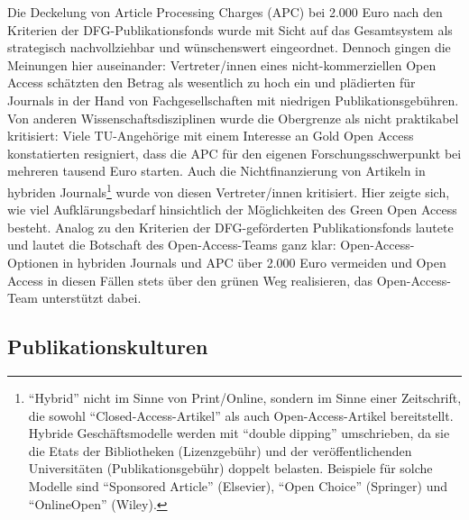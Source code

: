 \documentclass[a4paper,
fontsize=11pt,
oneside,
numbers=noperiodatend,
parskip=half-,
bibliography=totoc,
final
]{scrartcl}
\begin{document}
Die Deckelung von Article Processing Charges (APC) bei 2.000 Euro nach
den Kriterien der DFG-Publikationsfonds wurde mit Sicht auf das
Gesamtsystem als strategisch nachvollziehbar und wünschenswert
eingeordnet. Dennoch gingen die Meinungen hier auseinander:
Vertreter/innen eines nicht-kommerziellen Open Access schätzten den
Betrag als wesentlich zu hoch ein und plädierten für Journals in der
Hand von Fachgesellschaften mit niedrigen Publikationsgebühren. Von
anderen Wissenschaftsdisziplinen wurde die Obergrenze als nicht
praktikabel kritisiert: Viele TU-Angehörige mit einem Interesse an Gold
Open Access konstatierten resigniert, dass die APC für den eigenen
Forschungsschwerpunkt bei mehreren tausend Euro starten. Auch die
Nichtfinanzierung von Artikeln in hybriden Journals\footnote{\enquote{Hybrid}
  nicht im Sinne von Print/Online, sondern im Sinne einer Zeitschrift,
  die sowohl \enquote{Closed-Access-Artikel} als auch
  Open-Access-Artikel bereitstellt. Hybride Geschäftsmodelle werden mit
  \enquote{double dipping} umschrieben, da sie die Etats der
  Bibliotheken (Lizenzgebühr) und der veröffentlichenden Universitäten
  (Publikationsgebühr) doppelt belasten. Beispiele für solche Modelle
  sind \enquote{Sponsored Article} (Elsevier), \enquote{Open Choice}
  (Springer) und \enquote{OnlineOpen} (Wiley).} wurde von diesen
Vertreter/innen kritisiert. Hier zeigte sich, wie viel Aufklärungsbedarf
hinsichtlich der Möglichkeiten des Green Open Access besteht. Analog zu
den Kriterien der DFG-geförderten Publikationsfonds lautete und lautet
die Botschaft des Open-Access-Teams ganz klar: Open-Access-Optionen in
hybriden Journals und APC über 2.000 Euro vermeiden und Open Access in
diesen Fällen stets über den grünen Weg realisieren, das
Open-Access-Team unterstützt dabei.

\hypertarget{publikationskulturen}{%
\subsection*{Publikationskulturen}\label{publikationskulturen}}
\end{document}
